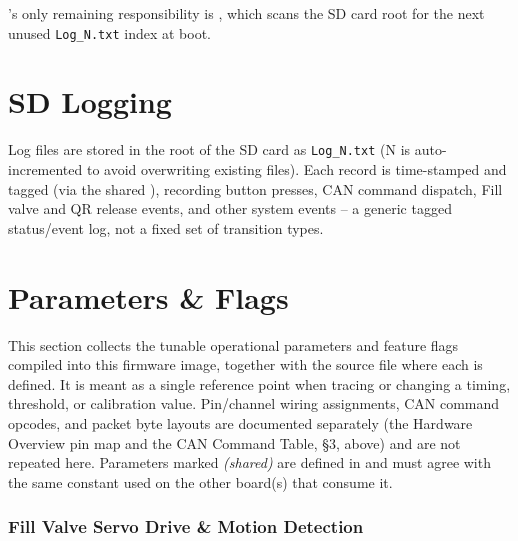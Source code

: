 ﻿\documentclass[11pt,letterpaper]{article}
\begin{document}
's only remaining responsibility is
, which scans the SD card root for the next
unused \texttt{Log\_N.txt} index at boot.

\section{SD Logging}

Log files are stored in the root of the SD card as \texttt{Log\_N.txt}
(N is auto-incremented to avoid overwriting existing files).
Each record is time-stamped and tagged (via the shared ),
recording button presses, CAN command dispatch, Fill valve and QR release
events, and other system events -- a generic tagged status/event log, not
a fixed set of transition types.

\section{Parameters \& Flags}

This section collects the tunable operational parameters and feature flags
compiled into this firmware image, together with the source file where each
is defined. It is meant as a single reference point when tracing or changing
a timing, threshold, or calibration value. Pin/channel wiring assignments,
CAN command opcodes, and packet byte layouts are documented separately (the
Hardware Overview pin map and the CAN Command Table, §3, above) and are not
repeated here. Parameters marked \emph{(shared)} are defined in
 and must agree with the same constant used on
the other board(s) that consume it.

\subsubsection*{Fill Valve Servo Drive \& Motion Detection}
\end{document}
